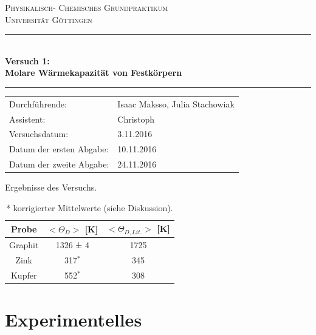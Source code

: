 \documentclass[12pt,a4paper,titlepage,headinclude,bibtotoc]{scrartcl}
\begin{document}
\begin{titlepage}
\centering
\textsc{\Large Physikalisch- Chemisches Grundpraktikum\\[1.5ex] Universität Göttingen}

\vspace*{0.5cm}

\rule{\textwidth}{1pt}\\[0.5cm]
{\huge \bfseries
  Versuch 1: \\[1.5ex]
  Molare Wärmekapazität von Festkörpern }\\[0.5cm]
\rule{\textwidth}{1pt}

\vspace*{0.5cm}


\begin{Large}
\begin{tabular}{ll}
Durchführende: &  Isaac Maksso, Julia Stachowiak\\
Assistent: & Christoph \\
 Versuchsdatum: & 3.11.2016\\
 Datum der ersten Abgabe: & 10.11.2016\\
 Datum der zweite Abgabe: & 24.11.2016\\
\end{tabular}
\end{Large}

\vspace*{0.5cm}


\begin{table}[h!]
\centering
\caption{Ergebnisse des Versuchs.}
\begin{tabular}{c|c|c}
Probe& $<\Theta_D >$ [K]& $<\Theta_{D,Lit.}>$ [K] \\
\hline
Graphit &1326 ± 4 & 1725\\
\hline
Zink & 317$^*$ & 345\\
\hline
Kupfer & 552$^*$ &308\\
\end{tabular}
\caption*{* korrigierter Mittelwerte (siehe Diskussion).}
\end{table}
\end{titlepage}


\tableofcontents

\newpage


\section{Experimentelles}
\end{document}

